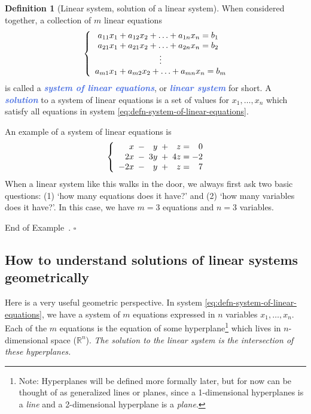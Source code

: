 \documentclass[10pt]{article}
\newcommand{\demph}[1]{\textcolor{RoyalBlue}{\textbf{\slshape #1}}} %
\theoremstyle{definition}
\newtheorem{definition}[theorem]{Definition}
\newtheorem{example}[theorem]{Example}
\renewenvironment{example}
{\begin{oldexample}}
  {\par\smallskip\hfill   End of Example~\theexample. $\square$    \par\end{oldexample}}
\newcommand{\R}{\mathbb{R}}           %
\begin{document}
\begin{definition}[Linear system, solution of a linear system]
  When considered together, a collection of $m$ linear equations
  \begin{equation}\label{eq:defn-system-of-linear-equations}
    \left\{ \begin{array}{l@{}l}
        \ a_{11}x_{1}+a_{12}x_{2}+\ldots+a_{1n}x_{n} = b_{1} \\
        \ a_{21}x_{1}+a_{21}x_{2}+\ldots+a_{2n}x_{n} = b_{2} \\
        \hfill\vdots\hfill \\
        a_{m1}x_{1}+a_{m2}x_{2}+\ldots+a_{mn}x_{n} = b_{m}
      \end{array}\right.
  \end{equation}
  is called a \demph{system of linear equations}, or \demph{linear system} for
  short. A \demph{solution} to a system of linear equations is a set of values
  for $x_{1},\ldots,x_{n}$ which satisfy all equations in
  system \eqref{eq:defn-system-of-linear-equations}.
\end{definition}

\begin{example}[A system of linear equations]
  \label{ex:system-linear-equations-first-example}
  An example of a system of linear equations is
  \begin{equation*}
    \left\{ \begin{array}{l@{}l}
        \hphantom{-2}x\; -\;  \hphantom{3}y \;+\;  \hphantom{4}z =\hphantom{-}0 \\
        \hphantom{-}2x\;-\; 3y\;+\; 4z= -2 \\
        -2x\;-\; \hphantom{3}y\;+\; \hphantom{4}z=\hphantom{-}7
      \end{array}\right.
  \end{equation*}
  When a linear system like this walks in the door, we always first ask two
  basic questions: (1) `how many equations does it have?' and (2) `how many
  variables does it have?'. In this case, we have $m=3$ equations and $n=3$
  variables.
\end{example}
\subsection{How to understand solutions of linear systems geometrically}
Here is a very useful geometric perspective. In
system \eqref{eq:defn-system-of-linear-equations}, we have a system of $m$ equations
expressed in $n$ variables $x_{1},\ldots,x_{n}$. Each of the $m$ equations is
the equation of some hyperplane\footnote{Note: Hyperplanes will be defined
  more formally later, but for now can be thought of as generalized lines or
  planes, since a 1-dimensional hyperplanes is a \textit{line} and a
  2-dimensional hyperplane is a \textit{plane}.} which lives in
$n$-dimensional space ($\R^{n}$). \textit{The solution to the linear system is the
  intersection of these hyperplanes.}
\end{document}
